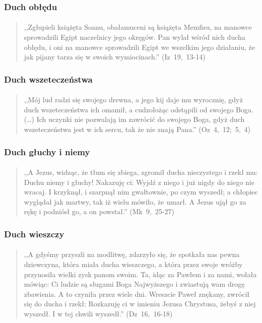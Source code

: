 \documentclass[10pt,a4paper,oneside]{article}
\begin{document}
\subsubsection{Duch obłędu}
\paragraph{}
\begin{quote}
,,Zgłupieli książęta Soanu, obałamuceni są książęta Memfisu, na manowce sprowadzili Egipt naczelnicy jego okręgów. Pan wylał wśród nich ducha obłędu, i oni na manowce sprowadzili Egipt we wszelkim jego działaniu, że jak pijany tarza się w swoich wymiocinach.'' \mbox{(Iz 19, 13-14)}
\end{quote}
\subsubsection{Duch wszeteczeństwa}
\paragraph{}
\begin{quote}
,,Mój lud radzi się swojego drewna, a jego kij daje mu wyrocznię, gdyż duch wszeteczeństwa ich omamił, a cudzołożąc odstąpili od swojego Boga. (\ldots) Ich uczynki nie pozwalają im zawrócić do swojego Boga, gdyż duch wszeteczeństwa jest w ich sercu, tak że nie znają Pana.'' \mbox{(Oz 4, 12; 5, 4)}
\end{quote}
\subsubsection{Duch głuchy i niemy}
\paragraph{}
\begin{quote}
,,A Jezus, widząc, że tłum się zbiega, zgromił ducha nieczystego i rzekł mu: Duchu niemy i głuchy! Nakazuję ci: Wyjdź z niego i już nigdy do niego nie wracaj. I krzyknął, i szarpnął nim gwałtownie, po czym wyszedł; a chłopiec wyglądał jak martwy, tak iż wielu mówiło, że umarł. A Jezus ujął go za rękę i podniósł go, a on powstał.'' \mbox{(Mk 9, 25-27)}
\end{quote}
\subsubsection{Duch wieszczy}
\paragraph{}
\begin{quote}
,,A gdyśmy przyszli na modlitwę, zdarzyło się, że spotkała nas pewna dziewczyna, która miała ducha wieszczego, a która przez swoje wróżby przynosiła wielki zysk panom swoim. Ta, idąc za Pawłem i za nami, wołała mówiąc: Ci ludzie są sługami Boga Najwyższego i zwiastują wam drogę zbawienia. A to czyniła przez wiele dni. Wreszcie Paweł znękany, zwrócił się do ducha i rzekł: Rozkazuję ci w imieniu Jezusa Chrystusa, żebyś z niej wyszedł. I w tej chwili wyszedł.'' \mbox{(Dz 16, 16-18)}
\end{quote}
\end{document}
